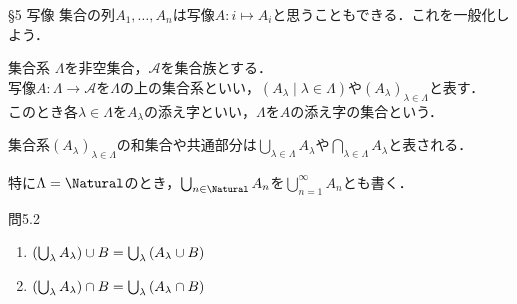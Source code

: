 \documentclass[uplatex,a4paper,dvipdfmx,aspectratio=169,11pt]{beamer}
\begin{document}
\begin{frame}[fragile]{\S 5 写像}
    集合の列$A_1, \ldots, A_n$は写像$A \colon i \mapsto A_i$と思うこともできる．これを一般化しよう．
    \begin{block}{集合系}
        $\Lambda$を非空集合，$\mathcal A$を集合族とする．\\
        写像$A \colon \Lambda \to \mathcal A$を$\Lambda$の上の\alert{集合系}といい，$(A_\lambda \mid \lambda \in \Lambda)$や$(A_\lambda)_{\lambda \in \Lambda}$と表す．\\
        このとき各$\lambda \in \Lambda$を$A_\lambda$の\alert{添え字}といい，$\Lambda$を$A$の\alert{添え字の集合}という．
    \end{block}
    \medskip

    集合系$(A_\lambda)_{\lambda \in \Lambda}$の和集合や共通部分は$\bigcup_{\lambda \in \Lambda} A_\lambda$や$\bigcap_{\lambda \in \Lambda} A_\lambda$と表される．
    \medskip

    特に$\Lambda = \Natural$のとき，$\bigcup_{n \in \Natural} A_n$を$\bigcup_{n = 1}^\infty A_n$とも書く．

    \begin{exampleblock}{問5.2}
        \begin{enumerate}[(1)]
            \item $\qty(\bigcup_\lambda A_\lambda) \cup B = \bigcup_\lambda \qty(A_\lambda \cup B)$
            \item $\qty(\bigcup_\lambda A_\lambda) \cap B = \bigcup_\lambda \qty(A_\lambda \cap B)$
        \end{enumerate}
    \end{exampleblock}
\end{frame}
\end{document}

